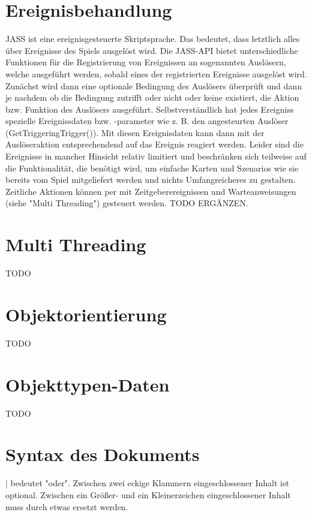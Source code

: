 \section { Ereignisbehandlung }
JASS ist eine ereignisgesteuerte Skriptsprache. Das bedeutet, dass letztlich alles über Ereignisse des Spiels ausgelöst wird. Die JASS-API bietet unterschiedliche
Funktionen für die Registrierung von Ereignissen an sogenannten Auslösern, welche ausgeführt werden, sobald eines der registrierten Ereignisse ausgelöst wird.
Zunächst wird dann eine optionale Bedingung des Auslösers überprüft und dann je nachdem ob die Bedingung zutrifft oder nicht oder keine existiert, die Aktion bzw.
Funktion des Auslösers ausgeführt. Selbstverständlich hat jedes Ereigniss spezielle Ereignissdaten bzw. -parameter wie z. B. den angesteurten Auslöser (GetTriggeringTrigger()).
Mit diesen Ereignisdaten kann dann mit der Auslöseraktion entsprechendend auf das Ereignis reagiert werden. Leider sind die Ereignisse in mancher Hinsicht relativ limitiert
und beschränken sich teilweise auf die Funktionalität, die benötigt wird, um einfache Karten und Szenarios wie sie bereits vom Spiel mitgeliefert werden und nichts Umfangreicheres
zu gestalten.
Zeitliche Aktionen können per mit Zeitgeberereignissen und Warteanweisungen (siehe "Multi Threading") gesteuert werden.
TODO ERGÄNZEN.

\section { Multi Threading }
TODO

\section { Objektorientierung }
TODO

\section { Objekttypen-Daten }
TODO

\section { Syntax des Dokuments }
| bedeutet "oder".
Zwischen zwei eckige Klammern eingeschlossener Inhalt ist optional.
Zwischen ein Größer- und ein Kleinerzeichen eingeschlossener Inhalt muss durch etwas ersetzt werden.
